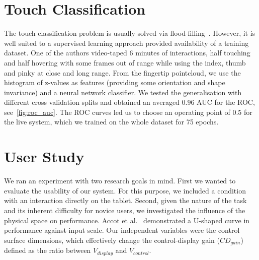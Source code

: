 \documentclass{chi-ext}
\begin{document}
\section{Touch Classification}
The touch classification problem is usually solved via flood-filling~\cite{Harrison2011,Xiao2016,Sridhar2017}. However, it is well suited to a supervised learning approach provided availability of a training dataset. One of the authors video-taped 6 minutes of interactions, half touching and half hovering with some frames out of range while using the index, thumb and pinky at close and long range. From the fingertip pointcloud, we use the histogram of z-values as features (providing some orientation and shape invariance) and a neural network classifier. We tested the generalisation with different cross validation splits and obtained an averaged 0.96 AUC for the ROC, see~\autoref{fig:roc_auc}. The ROC curves led us to choose an operating point of 0.5 for the live system, which we trained on the whole dataset for 75 epochs.




\section{User Study}
We ran an experiment with two research goals in mind. First we wanted to evaluate the usability of our system. For this purpose, we included a condition with an interaction directly on the tablet. Second, given the nature of the task and its inherent difficulty for novice users, we investigated the influence of the physical space on performance. Accot et al.~\cite{Accot2001} demonstrated a U-shaped curve in performance against input scale. Our independent variables were the control surface dimensions, which effectively change the control-display gain ($CD_{gain}$) defined as the ratio between $V_{display}$ and $V_{control}$.
\end{document}
